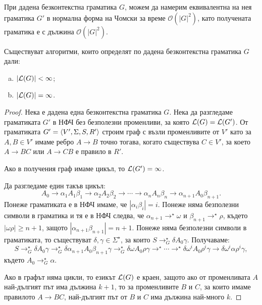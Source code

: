 \begin{thm}
  При дадена безконтекстна граматика $G$, можем да намерим еквивалентна
  на нея граматика $G'$ в нормална форма на Чомски за време $\mathcal{O}(|G|^2)$,
  като получената граматика е с дължина $\mathcal{O}(|G|^2)$.
\end{thm}

\begin{thm}
  Съществуват алгоритми, които определят по дадена безконтекстна граматика $G$ дали:
  \begin{enumerate}[a)]
  \item
    $\vert{\mathcal{L}(G)}\vert < \infty$;
  \item
    $\vert{\mathcal{L}(G)}\vert = \infty$.
  \end{enumerate}
\end{thm}
\begin{proof}
  Нека е дадена една безконтекстна граматика $G$.
  Нека да разгледаме граматиката $G'$ в НФЧ без безполезни променливи, за която $\mathcal{L}(G) = \mathcal{L}(G')$.
  От граматиката $G' = \langle{V',\Sigma,S,R'}\rangle$ строим граф с възли променливите от $V'$ като
  за $A,B \in V'$ имаме ребро $A \to B$ точно тогава, когато съществува $C \in V'$,
  за което $A \to BC$ или $A \to CB$ е правило в $R'$.
  
  Ако в получения граф имаме цикъл, то $\mathcal{L}(G') = \infty$.

  Да разгледаме един такъв цикъл:
  \[A_0 \to \alpha_1 A_1 \beta_1 \to \alpha_2 A_2 \beta_2 \to \cdots \to \alpha_n A_n \beta_n \to \alpha_{n+1} A_0 \beta_{n+1}.\]
  Понеже граматиката е в НФЧ имаме, че $|\alpha_i\beta_i| = i$.
  Понеже няма безполезни символи в граматика и тя е в НФЧ следва, че $\alpha_{n+1} \to^\star \omega$ и $\beta_{n+1} \to^\star \rho$,
  където $|\omega\rho| \geq n+1$, защото $|\alpha_{n+1}\beta_{n+1}| = n+1$.
  Понеже няма безполезни символи в граматиката, то съществуват $\delta, \gamma \in \Sigma^\star$, за които
  $S \to^\star_G \delta  A_0 \gamma$. Получаваме:
  \[ S \to^\star_G \delta A_0 \gamma \to^\star_G \delta \alpha_{n+1} A_0 \beta_{n+1} \gamma \to^\star_G \delta \omega A_0 \rho\gamma \to^\star \cdots \to^\star \delta \omega^i A_0 \rho^i \gamma \to \delta\omega^i\alpha\rho^i\gamma,\]
  където $A_0 \to^\star_G \alpha$.

  Ако в графът няма цикли, то езикът $\mathcal{L}(G)$ е краен, защото ако от променливата $A$ най-дългият път има дължина $k+1$,
  то за променливите $B$ и $C$, за които имаме правилото $A\to BC$, най-дългият път от $B$ и $C$ има дължина най-много $k$.


\end{proof}
